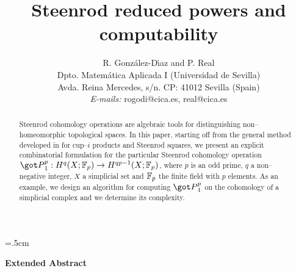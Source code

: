 \title{\LARGE \bf Steenrod reduced powers and computability}
\author{\small R. Gonz\'{a}lez-D\'{\i}az and P. Real\\
\small Dpto. Matem\'{a}tica Aplicada I (Universidad de Sevilla)\\
\small Avda. Reina Mercedes, s/n. CP: 41012 Sevilla (Spain)\\
\small  {\em E-mails:} rogodi@cica.es, real@cica.es}
\date{}
\textheight=615pt
\textwidth=425pt
\oddsidemargin=0pt
\headheight=0pt
\headsep=7pt
\hoffset=0pt
\voffset=0pt
\topmargin=10pt
\marginparsep=10pt
\marginparwidth=30pt
\footheight=10pt
\footskip=40pt
\parskip=.5cm
\setlength{\baselineskip}{8ex}
\newcommand{\ra}{\rightarrow}
\newcommand{\la}{\leftarrow}
\newcommand{\scst}{\scriptscriptstyle}
\newcommand{\ot}{\otimes}
\newcommand{\Z}{\Bbb Z}
\newcommand{\Zp}{{\Bbb Z}_p}
\newcommand{\pa}{\partial}
\newcommand{\Fp}{{\Bbb F}_p}
\newcommand{\Fr}{{\Bbb F}_2}
\newtheorem{prp}{Proposition}[section]
\newtheorem{lmm}[prp]{Lemma}
\newtheorem{thr}[prp]{Theorem}
\newtheorem{dfn}[prp]{Definition}
\newtheorem{rmr}[prp]{Remark}
\newtheorem{crl}[prp]{Corollary}
\newtheorem{ejemplo}[prp]{Example}
\newtheorem{notacion}[prp]{Notation}


\sloppy
\maketitle
\vspace{0.5cm}

\begin{abstract}
Steenrod cohomology operations are  algebraic tools for
distinguishing non--homeomorphic topological spaces.
In this paper, starting off from the general method developed
in \cite{jpaa} for cup--$i$ products and
Steenrod squares,
we present an explicit combinatorial formulation for
the particular Steenrod cohomology operation ${\got P}_1^{p}:
H^{q}(X;\Fp) \rightarrow H^{ qp-1} (X;\Fp)$, where $p$ is an odd
prime, $q$ a non--negative integer, $X$ a simplicial set and $\Fp$
the finite field with $p$ elements.
As an example, we design an algorithm for computing ${\got P}_1^{p}$
on the cohomology of a simplicial complex and we determine its
complexity.
\end{abstract}

\begin{center}
{\bf Extended Abstract}
\end{center}

